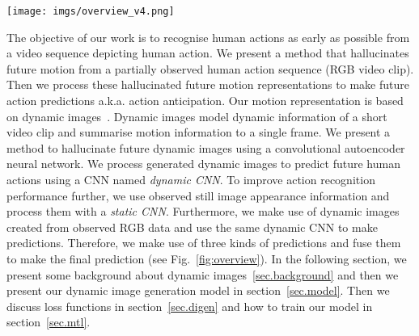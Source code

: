 \begin{figure*}
    \centering
  \texttt{[image: imgs/overview\_v4.png]}
    \caption{\textbf{Overview of our approach}. We receive as an input a sequence of RGB video frames \textbf{(a)}. Then we use RGB images with windows size $T$ to compute the Dynamic Images for seen part of the video \textbf{(b)}. The last dynamic image of the seen part is used to feed our dynamic image generator and generate $\hat{D}_{t+1}$ \textbf{(c)}. Next, we feed {\em Dynamic} CNN with observed dynamic images and generated dynamic images and {\em Static} CNN with RGB images \textbf{(d)}. Finally, we fusion all the outputs of our recognition networks \textbf{(e)}.} 
  \label{fig:overview}
\end{figure*}

The objective of our work is to recognise human actions as early as possible from a video sequence depicting human action.
We present a method that hallucinates future motion from a partially observed human action sequence (RGB video clip).
Then we process these hallucinated future motion representations to make future action predictions a.k.a. action anticipation.
Our motion representation is based on dynamic images~\cite{bilen2016dynamic,Bilen2017}.
Dynamic images model dynamic information of a short video clip and summarise motion information to a single frame.
We present a method to hallucinate future dynamic images using a convolutional autoencoder neural network. 
We process generated dynamic images to predict future human actions using a CNN named \emph{dynamic CNN}. 
To improve action recognition performance further, we use observed still image appearance information and process them with a \emph{static CNN}.
Furthermore, we make use of dynamic images created from observed RGB data and use the same dynamic CNN to make predictions.
Therefore, we make use of three kinds of predictions and fuse them to make the final prediction (see Fig.~\ref{fig:overview}).
In the following section, we present some background about dynamic images~\ref{sec.background} and then we present our dynamic image generation model in section~\ref{sec.model}. Then we discuss loss functions in section~\ref{sec.digen} and how to train our model in section~\ref{sec.mtl}.
%
